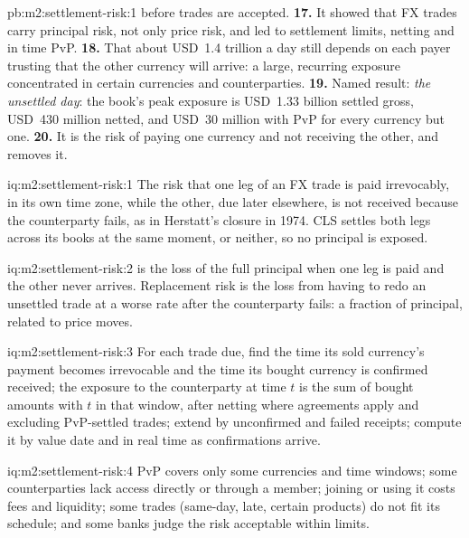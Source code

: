 \begin{solution}{pb:m2:settlement-risk:1}
before trades are accepted.
\textbf{17.} It showed that FX trades carry principal risk, not only price risk, and
led to settlement limits, netting and in time PvP.
\textbf{18.} That about USD~1.4 trillion a day still depends on each payer trusting
that the other currency will arrive: a large, recurring exposure concentrated in
certain currencies and counterparties.
\textbf{19.} Named result: \emph{the unsettled day}: the book's peak exposure is
USD~1.33 billion settled gross, USD~430 million netted, and USD~30 million with PvP
for every currency but one.
\textbf{20.} It is the risk of paying one currency and not receiving the other, and
 removes it.
\end{solution}

\begin{solution}{iq:m2:settlement-risk:1}
The risk that one leg of an FX trade is paid irrevocably, in its own time zone,
while the other, due later elsewhere, is not received because the counterparty
fails, as in Herstatt's closure in 1974. CLS settles both legs across its books at
the same moment, or neither, so no principal is exposed.
\end{solution}

\begin{solution}{iq:m2:settlement-risk:2}
 is the loss of the full principal when one leg is paid and the
other never arrives. Replacement risk is the loss from having to redo an unsettled
trade at a worse rate after the counterparty fails: a fraction of principal,
related to price moves.
\end{solution}

\begin{solution}{iq:m2:settlement-risk:3}
For each trade due, find the time its sold currency's payment becomes irrevocable
and the time its bought currency is confirmed received; the exposure to the
counterparty at time $t$ is the sum of bought amounts with $t$ in that window,
after netting where agreements apply and excluding PvP-settled trades; extend by
unconfirmed and failed receipts; compute it by value date and in real time as
confirmations arrive.
\end{solution}

\begin{solution}{iq:m2:settlement-risk:4}
PvP covers only some currencies and time windows; some counterparties lack access
directly or through a member; joining or using it costs fees and liquidity; some
trades (same-day, late, certain products) do not fit its schedule; and some banks
judge the risk acceptable within limits.
\end{solution}

